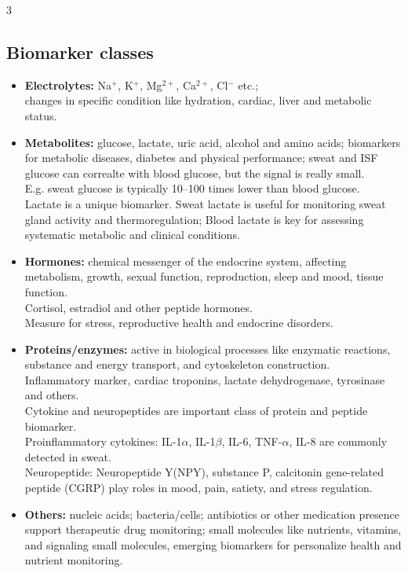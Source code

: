 \documentclass[10pt,a4paper]{ctexart}
\newcommand{\key}[1]{\textbf{#1}}
\begin{document}
\begin{multicols*}{3}
\subsection{Biomarker classes}
\begin{itemize}
  \item \key{Electrolytes:} Na$^+$, K$^+$, Mg$^{2+}$, Ca$^{2+}$, Cl$^-$ etc.;\\
  changes in specific condition like hydration, cardiac, liver and metabolic status.
  \item \key{Metabolites:} glucose, lactate, uric acid, alcohol and amino acids; 
  biomarkers for metabolic diseases, diabetes and physical performance; 
  sweat and ISF glucose can correalte with blood glucose, but the signal is really small.\\
  E.g. sweat glucose is typically 10--100 times lower than blood glucose.\\
  Lactate is a unique biomarker. 
  Sweat lactate is useful for monitoring sweat gland activity and thermoregulation; 
  Blood lactate is key for assessing systematic metabolic and clinical conditions.
  \item \key{Hormones:} chemical messenger of the endocrine system, affecting metabolism, 
  growth, sexual function, reproduction, sleep and mood, tissue function.\\
  Cortisol, estradiol and other peptide hormones.\\
  Measure for stress, reproductive health and endocrine disorders.
  \item \key{Proteins/enzymes:} active in biological processes like enzymatic reactions, 
  substance and energy transport, and cytoskeleton construction.\\
  Inflammatory marker, cardiac troponins, lactate dehydrogenase, tyrosinase and others.\\
  Cytokine and neuropeptides are important class of protein and peptide biomarker.\\
  Proinflammatory cytokines: IL-1$\alpha$, IL-1$\beta$, IL-6, TNF-$\alpha$, 
  IL-8 are commonly detected in sweat.\\
  Neuropeptide: Neuropeptide Y(NPY), substance P, calcitonin gene-related peptide 
  (CGRP) play roles in mood, pain, satiety, and stress regulation.
  \item \key{Others:} nucleic acids; bacteria/cells; 
  antibiotics or other medication presence support therapeutic drug monitoring;
  small molecules like nutrients, vitamins, and signaling small molecules, 
  emerging biomarkers for personalize health and nutrient monitoring.
\end{itemize}


\end{multicols*}
\end{document}
